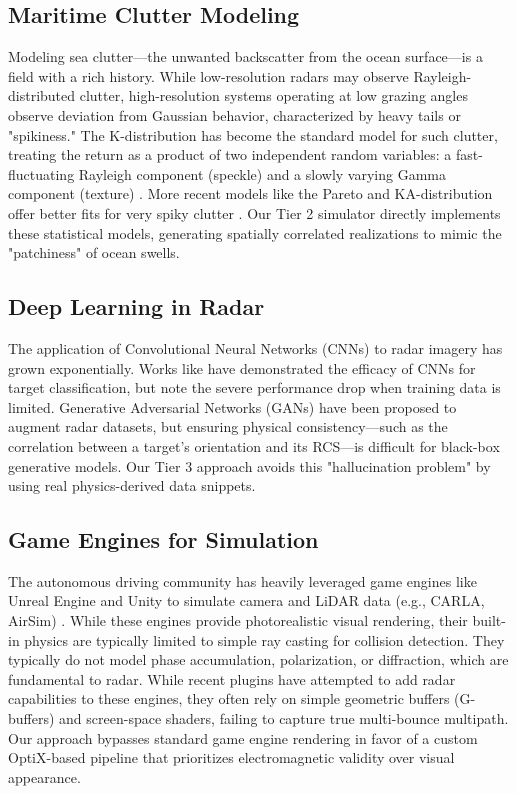 \documentclass[conf]{new-aiaa}
\begin{document}
\subsection{Maritime Clutter Modeling}
Modeling sea clutter—the unwanted backscatter from the ocean surface—is a field with a rich history. While low-resolution radars may observe Rayleigh-distributed clutter, high-resolution systems operating at low grazing angles observe deviation from Gaussian behavior, characterized by heavy tails or "spikiness." The K-distribution has become the standard model for such clutter, treating the return as a product of two independent random variables: a fast-fluctuating Rayleigh component (speckle) and a slowly varying Gamma component (texture) \cite{ward2013sea}. More recent models like the Pareto and KA-distribution offer better fits for very spiky clutter \cite{jakeman1976}. Our Tier 2 simulator directly implements these statistical models, generating spatially correlated realizations to mimic the "patchiness" of ocean swells.

\subsection{Deep Learning in Radar}
The application of Convolutional Neural Networks (CNNs) to radar imagery has grown exponentially. Works like \cite{carrara2019evaluation} have demonstrated the efficacy of CNNs for target classification, but note the severe performance drop when training data is limited. Generative Adversarial Networks (GANs) have been proposed to augment radar datasets, but ensuring physical consistency—such as the correlation between a target's orientation and its RCS—is difficult for black-box generative models. Our Tier 3 approach avoids this "hallucination problem" by using real physics-derived data snippets.

\subsection{Game Engines for Simulation}
The autonomous driving community has heavily leveraged game engines like Unreal Engine and Unity to simulate camera and LiDAR data (e.g., CARLA, AirSim) \cite{dosovitskiy2017carla}. While these engines provide photorealistic visual rendering, their built-in physics are typically limited to simple ray casting for collision detection. They typically do not model phase accumulation, polarization, or diffraction, which are fundamental to radar. While recent plugins have attempted to add radar capabilities to these engines, they often rely on simple geometric buffers (G-buffers) and screen-space shaders, failing to capture true multi-bounce multipath. Our approach bypasses standard game engine rendering in favor of a custom OptiX-based pipeline that prioritizes electromagnetic validity over visual appearance.
\end{document}
